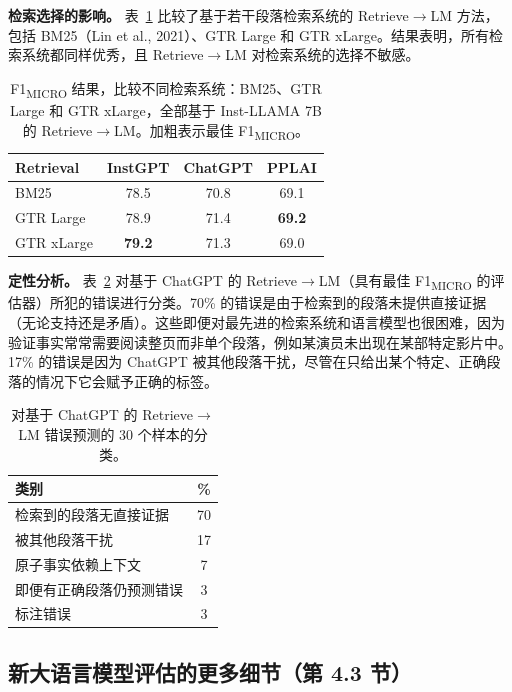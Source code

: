 \documentclass[11pt,UTF8,fontset=fandol]{ctexart}
\begin{document}
\textbf{检索选择的影响。} 表~\ref{tab:12} 比较了基于若干段落检索系统的 Retrieve$\rightarrow$LM 方法，包括 BM25（Lin et al., 2021）、GTR Large 和 GTR xLarge。结果表明，所有检索系统都同样优秀，且 Retrieve$\rightarrow$LM 对检索系统的选择不敏感。

\begin{table}[H]\centering
\caption{F1\textsubscript{MICRO} 结果，比较不同检索系统：BM25、GTR Large 和 GTR xLarge，全部基于 Inst-LLAMA 7B 的 Retrieve$\rightarrow$LM。加粗表示最佳 F1\textsubscript{MICRO}。}
\label{tab:12}
\begin{tabular}{lccc}
\toprule
Retrieval & InstGPT & ChatGPT & PPLAI \\
\midrule
BM25 & 78.5 & 70.8 & 69.1 \\
GTR Large & 78.9 & 71.4 & \textbf{69.2} \\
GTR xLarge & \textbf{79.2} & 71.3 & 69.0 \\
\bottomrule
\end{tabular}
\end{table}

\textbf{定性分析。} 表~\ref{tab:13} 对基于 ChatGPT 的 Retrieve$\rightarrow$LM（具有最佳 F1\textsubscript{MICRO} 的评估器）所犯的错误进行分类。70\% 的错误是由于检索到的段落未提供直接证据（无论支持还是矛盾）。这些即便对最先进的检索系统和语言模型也很困难，因为验证事实常常需要阅读整页而非单个段落，例如某演员未出现在某部特定影片中。17\% 的错误是因为 ChatGPT 被其他段落干扰，尽管在只给出某个特定、正确段落的情况下它会赋予正确的标签。

\begin{table}[H]\centering
\caption{对基于 ChatGPT 的 Retrieve$\rightarrow$LM 错误预测的 30 个样本的分类。}
\label{tab:13}
\begin{tabular}{lc}
\toprule
类别 & \% \\
\midrule
检索到的段落无直接证据 & 70 \\
被其他段落干扰 & 17 \\
原子事实依赖上下文 & 7 \\
即便有正确段落仍预测错误 & 3 \\
标注错误 & 3 \\
\bottomrule
\end{tabular}
\end{table}

\subsection{新大语言模型评估的更多细节（第 4.3 节）}
\end{document}

